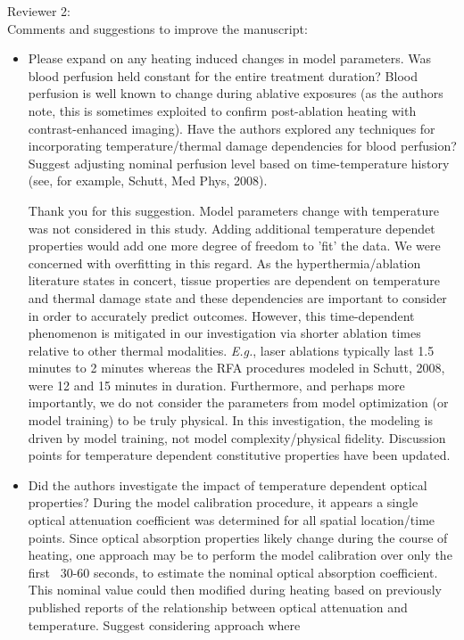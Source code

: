 \documentclass[letterpaper,12pt]{report}
\begin{document}
Reviewer 2:\\
Comments and suggestions to improve the manuscript:\\
\begin{itemize}
\item
Please expand on any heating induced changes in model parameters. Was blood perfusion held constant for the
entire treatment duration? Blood perfusion is well
known to change during ablative exposures (as the
authors note, this is sometimes exploited to confirm post-ablation heating with contrast-enhanced imaging).  Have the authors explored any techniques for
incorporating temperature/thermal damage dependencies for blood perfusion? Suggest adjusting nominal
perfusion level based on time-temperature history (see, for example, Schutt, Med Phys, 2008).

{\color{red}
Thank you for this suggestion. Model parameters change with temperature was
not considered in this study. 
Adding additional temperature dependet
properties would add one more degree of freedom to 'fit' the data. 
We were concerned with overfitting in this regard.
As the hyperthermia/ablation literature states in concert, tissue properties
are dependent on temperature and thermal damage state and these dependencies
are important to consider in order to accurately predict
outcomes. 
However, this time-dependent phenomenon is mitigated in our investigation via shorter ablation
times relative to other thermal modalities. \textit{E.g.}, laser ablations typically last 1.5 minutes to 2 minutes
whereas the RFA procedures modeled in Schutt, 2008, were 12 and 15 minutes in duration. Furthermore, and
perhaps more importantly, we do not consider the parameters from model optimization (or model
training) to be truly physical. In this investigation, the modeling is driven by model training, not model
complexity/physical fidelity. 
Discussion points for temperature dependent constitutive properties have
been updated.
}
\item
Did the authors investigate the impact of temperature dependent optical properties? During the model
calibration procedure, it appears a single optical attenuation coefficient was determined for all spatial
location/time points. Since optical absorption properties likely change during the course of heating,
one approach may be to perform the model calibration over only the first ~30-60 seconds, to estimate the
nominal optical absorption coefficient. This nominal value could then modified during heating based on
previously published reports of the relationship between optical attenuation and temperature. Suggest
considering approach where


\end{itemize}
\end{document}
